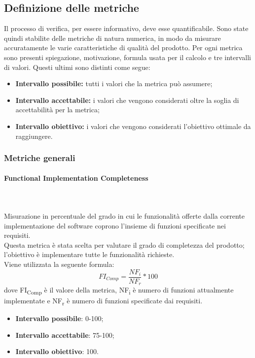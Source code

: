 \subsection{Definizione delle metriche}
Il processo di verifica, per essere informativo, deve esse quantificabile. Sono state quindi stabilite delle metriche di natura numerica, in modo da misurare accuratamente le varie caratteristiche di qualità del prodotto. Per ogni metrica sono presenti  spiegazione, motivazione, formula usata per il calcolo e tre intervalli di valori. Questi ultimi sono distinti come segue:
\begin{itemize}
	\item {\textbf{Intervallo possibile:} tutti i valori che la metrica può assumere;}
	\item {\textbf{Intervallo accettabile:} i valori che vengono considerati oltre la soglia di accettabilità per la metrica;}
	\item {\textbf{Intervallo obiettivo:} i valori che vengono considerati l'obiettivo ottimale da raggiungere.}
\end{itemize}
\subsubsection{Metriche generali}
\paragraph{Functional Implementation Completeness} ~\\ ~\\
Misurazione in percentuale del grado in cui le funzionalità offerte dalla corrente implementazione del software coprono l'insieme di funzioni specificate nei requisiti.\\
Questa metrica è stata scelta per valutare il grado di completezza del prodotto; l'obiettivo è implementare tutte le funzionalità richieste.\\
Viene utilizzata la seguente formula:
$$FI_{Comp}=\frac{NF_i}{NF_r}*100$$
dove FI\textsubscript{Comp} è il valore della metrica, NF\textsubscript{i} è numero di funzioni attualmente implementate e NF\textsubscript{r} è numero di funzioni specificate dai requisiti.
\begin{itemize}
	\item{\textbf{Intervallo possibile}: 0-100;}
	\item{\textbf{Intervallo accettabile}: 75-100;}
	\item{\textbf{Intervallo obiettivo}: 100.}
\end{itemize}

